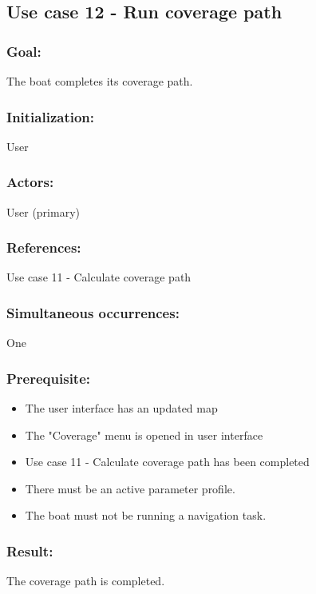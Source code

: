 
\subsection{Use case 12 - Run coverage path}
\subsubsection*{Goal:}
The boat completes its coverage path.

\subsubsection*{Initialization:}
User

\subsubsection*{Actors:}
User (primary)

\subsubsection*{References:}
Use case 11 - Calculate coverage path

\subsubsection*{Simultaneous occurrences:}
One 

\subsubsection*{Prerequisite:}
\begin{itemize}
	\item The user interface has an updated map
	\item The "Coverage" menu is opened in user interface
	\item Use case 11 - Calculate coverage path has been completed
	\item There must be an active parameter profile.
	\item The boat must not be running a navigation task.
\end{itemize}

\subsubsection*{Result:}
The coverage path is completed.

